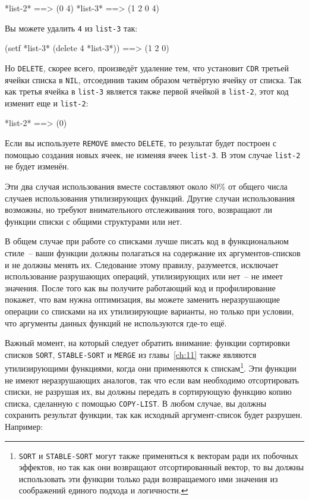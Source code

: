 \begin{myverb}
*list-2* ==> (0 4)
*list-3* ==> (1 2 0 4)
\end{myverb}

Вы можете удалить \lstinline{4} из \lstinline{list-3} так:

\begin{myverb}
(setf *list-3* (delete 4 *list-3*)) ==> (1 2 0)
\end{myverb}

Но \lstinline{DELETE}, скорее всего, произведёт удаление тем, что установит \lstinline{CDR} третьей
ячейки списка в \lstinline{NIL}, отсоединив таким образом четвёртую ячейку от
списка. Так как третья ячейка в \lstinline{list-3} является также первой ячейкой в \lstinline{list-2},
этот код изменит еще и \lstinline{list-2}:

\begin{myverb}
*list-2* ==> (0)
\end{myverb}

Если вы используете \lstinline{REMOVE} вместо \lstinline{DELETE}, то результат будет построен с
помощью создания новых ячеек, не изменяя ячеек \lstinline{list-3}. В этом случае \lstinline{list-2}
не будет изменён.

Эти два случая использования вместе составляют около 80\% от общего числа случаев
использования утилизирующих функций. Другие случаи использования возможны, но требуют
внимательного отслеживания того, возвращают ли функции списки с общими структурами или нет.

В общем случае при работе со списками лучше писать код в функциональном стиле~-- ваши
функции должны полагаться на содержание их аргументов-списков и не должны менять
их. Следование этому правилу, разумеется, исключает использование разрушающих операций,
утилизирующих или нет~-- не имеет значения. После того как вы получите работающий код и
профилирование покажет, что вам нужна оптимизация, вы можете заменить неразрушающие
операции со списками на их утилизирующие варианты, но только при условии, что аргументы
данных функций не используются где-то ещё.

Важный момент, на который следует обратить внимание: функции сортировки списков
\lstinline{SORT}, \lstinline{STABLE-SORT} и \lstinline{MERGE} из главы~\ref{ch:11} также являются
утилизирующими функциями, когда они применяются к спискам\footnote{\lstinline{SORT} и
  \lstinline{STABLE-SORT} могут также применяться к векторам ради их побочных эффектов, но
  так как они возвращают отсортированный вектор, то вы должны использовать эти функции только
  ради возвращаемого ими значения из соображений единого подхода и логичности.}. Эти
функции не имеют неразрушающих аналогов, так что если вам необходимо отсортировать списки,
не разрушая их, вы должны передать в сортирующую функцию копию списка, сделанную с помощью
\lstinline{COPY-LIST}. В любом случае, вы должны сохранить результат функции, так как исходный
аргумент-список будет разрушен. Например:

